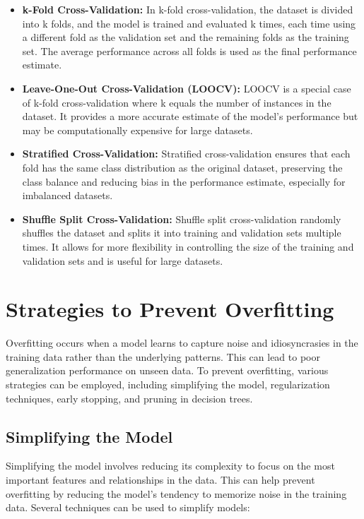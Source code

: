 \documentclass[12pt]{book} %
\begin{document}
\begin{itemize}
    \item \textbf{k-Fold Cross-Validation:} In k-fold cross-validation, the dataset is divided into k folds, and the model is trained and evaluated k times, each time using a different fold as the validation set and the remaining folds as the training set. The average performance across all folds is used as the final performance estimate.
    
    \item \textbf{Leave-One-Out Cross-Validation (LOOCV):} LOOCV is a special case of k-fold cross-validation where k equals the number of instances in the dataset. It provides a more accurate estimate of the model's performance but may be computationally expensive for large datasets.
    
    \item \textbf{Stratified Cross-Validation:} Stratified cross-validation ensures that each fold has the same class distribution as the original dataset, preserving the class balance and reducing bias in the performance estimate, especially for imbalanced datasets.
    
    \item \textbf{Shuffle Split Cross-Validation:} Shuffle split cross-validation randomly shuffles the dataset and splits it into training and validation sets multiple times. It allows for more flexibility in controlling the size of the training and validation sets and is useful for large datasets.
\end{itemize}

\section{Strategies to Prevent Overfitting}

Overfitting occurs when a model learns to capture noise and idiosyncrasies in the training data rather than the underlying patterns. This can lead to poor generalization performance on unseen data. To prevent overfitting, various strategies can be employed, including simplifying the model, regularization techniques, early stopping, and pruning in decision trees.

\subsection{Simplifying the Model}

Simplifying the model involves reducing its complexity to focus on the most important features and relationships in the data. This can help prevent overfitting by reducing the model's tendency to memorize noise in the training data. Several techniques can be used to simplify models:
\end{document}
